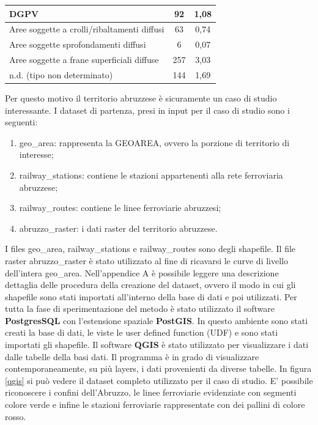 \begin{table}[h]
\begin{tabular}{|l|c|c|}
		DGPV                                                                                            & 92                                       & 1,08                               \\ \hline
		Aree soggette a crolli/ribaltamenti diffusi                                                     & 63                                       & 0,74                               \\ \hline
		Aree soggette sprofondamenti diffusi                                                            & 6                                        & 0,07                               \\ \hline
		Aree soggette a frane superficiali diffuse                                                      & 257                                      & 3,03                               \\ \hline
		n.d. (tipo non determinato)                                                                     & 144                                      & 1,69                               \\ \hline
	\end{tabular}
\end{table}


Per questo motivo il territorio abruzzese è sicuramente un caso di studio interessante.
I dataset di partenza, presi in input per il caso di studio sono i seguenti:
\begin{enumerate}
	\item geo\_area: rappresenta la GEOAREA, ovvero la porzione di territorio di interesse;
	\item railway\_stations: contiene le stazioni appartenenti alla rete ferroviaria abruzzese;
	\item railway\_routes: contiene le linee ferroviarie abruzzesi;
	\item abruzzo\_raster: i dati raster del territorio abruzzese.
\end{enumerate}
I files geo\_area, railway\_stations e railway\_routes sono degli shapefile. Il file raster abruzzo\_raster è stato utilizzato al fine di ricavarsi le curve di livello dell'intera geo\_area. Nell'appendice A è possibile leggere una descrizione dettaglia delle procedura della creazione del dataset, ovvero il modo in cui gli shapefile sono stati importati all'interno della base di dati e poi utilizzati.
Per tutta la fase di sperimentazione del metodo è stato utilizzato il software \textbf{PostgresSQL} con l’estensione spaziale \textbf{PostGIS}. In questo ambiente sono stati creati la base di dati, le viste le user defined function (UDF) e sono stati importati gli shapefile. Il software \textbf{QGIS} è stato utilizzato per visualizzare i dati dalle tabelle della basi dati. Il programma è in grado di visualizzare contemporaneamente, su più layers, i dati provenienti da diverse tabelle. In figura \ref{qgis} si può vedere il dataset completo utilizzato per il caso di studio. E' possibile riconoscere i confini dell'Abruzzo, le linee ferroviarie evidenziate con segmenti colore verde e infine le stazioni ferroviarie rappresentate con dei pallini di colore rosso.


